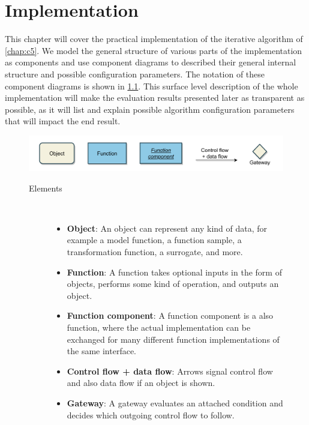 \documentclass[
  a4paper,  %
  twoside,  %
  bibliography=totoc,
  headsepline,
  cleardoublepage=empty,
  parskip=half,
  draft=false
]{scrbook}
\begin{document}
\chapter{Implementation}
\label{chap:c6}

This chapter will cover the practical implementation of the iterative algorithm of \cref{chap:c5}.
We model the general structure of various parts of the implementation as components and use component diagrams to described their general internal structure and possible configuration parameters.
The notation of these component diagrams is shown in \cref{fig:defs}.
This surface level description of the whole implementation will make the evaluation results presented later as transparent as possible, as it will list and explain possible algorithm configuration parameters that will impact the end result.

\begin{mdframed}[style=style,frametitle={Notation}]
\begin{figure}[H]

\includegraphics[width=\textwidth]{graphics/definitions.pdf}
\vspace{-7.5mm}

\delimit

\vspace{3.5mm}

\begin{description}
\item[Elements] {~ \begin{itemize}[\null]
\item \textbf{Object}: An object can represent any kind of data, for example a model function, a function sample, a transformation function, a surrogate, and more.
\item \textbf{Function}: A function takes optional inputs in the form of objects, performs some kind of operation, and outputs an object.
\item \textbf{Function component}: A function component is a also function, where the actual implementation can be exchanged for many different function implementations of the same interface.
\item \textbf{Control flow + data flow}: Arrows signal control flow and also data flow if an object is shown.
\item \textbf{Gateway}: A gateway evaluates an attached condition and decides which outgoing control flow to follow.
\end{itemize}}
\end{description}

\delimit

\label{fig:defs}
\end{figure}
\end{mdframed}
\end{document}
